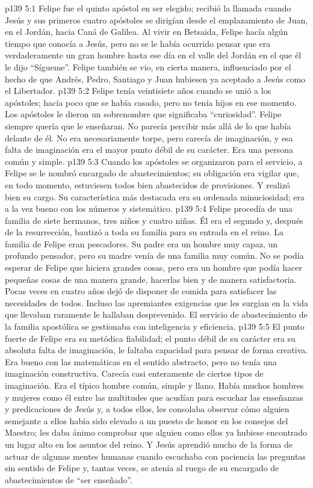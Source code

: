 \vs p139 5:1 Felipe fue el quinto apóstol en ser elegido; recibió la llamada cuando Jesús y sus primeros cuatro apóstoles se dirigían desde el emplazamiento de Juan, en el Jordán, hacia Caná de Galilea. Al vivir en Betsaida, Felipe hacía algún tiempo que conocía a Jesús, pero no se le había ocurrido pensar que era verdaderamente un gran hombre hasta ese día en el valle del Jordán en el que él le dijo “Sígueme”. Felipe también se vio, en cierta manera, influenciado por el hecho de que Andrés, Pedro, Santiago y Juan hubiesen ya aceptado a Jesús como el Libertador.
\vs p139 5:2 Felipe tenía veintisiete años cuando se unió a los apóstoles; hacía poco que se había casado, pero no tenía hijos en ese momento. Los apóstoles le dieron un sobrenombre que significaba “curiosidad”. Felipe siempre quería que le enseñaran. No parecía percibir más allá de lo que había delante de él. No era necesariamente torpe, pero carecía de imaginación, y esa falta de imaginación era el mayor punto débil de su carácter. Era una persona común y simple.
\vs p139 5:3 \pc Cuando los apóstoles se organizaron para el servicio, a Felipe se le nombró encargado de abastecimientos; su obligación era vigilar que, en todo momento, estuviesen todos bien abastecidos de provisiones. Y realizó bien su cargo. Su característica más destacada era su ordenada minuciosidad; era a la vez bueno con los números y sistemático.
\vs p139 5:4 Felipe procedía de una familia de siete hermanos, tres niños y cuatro niñas. Él era el segundo y, después de la resurrección, bautizó a toda su familia para su entrada en el reino. La familia de Felipe eran pescadores. Su padre era un hombre muy capaz, un profundo pensador, pero su madre venía de una familia muy común. No se podía esperar de Felipe que hiciera grandes cosas, pero era un hombre que podía hacer pequeñas cosas de una manera grande, hacerlas bien y de manera satisfactoria. Pocas veces en cuatro años dejó de disponer de comida para satisfacer las necesidades de todos. Incluso las apremiantes exigencias que les surgían en la vida que llevaban raramente le hallaban desprevenido. El servicio de abastecimiento de la familia apostólica se gestionaba con inteligencia y eficiencia.
\vs p139 5:5 El punto fuerte de Felipe era su metódica fiabilidad; el punto débil de su carácter era su absoluta falta de imaginación, le faltaba capacidad para pensar de forma creativa. Era bueno con las matemáticas en el sentido abstracto, pero no tenía una imaginación constructiva. Carecía casi enteramente de ciertos tipos de imaginación. Era el típico hombre común, simple y llano. Había muchos hombres y mujeres como él entre las multitudes que acudían para escuchar las enseñanzas y predicaciones de Jesús y, a todos ellos, les consolaba observar cómo alguien semejante a ellos había sido elevado a un puesto de honor en los consejos del Maestro; les daba ánimo comprobar que alguien como ellos ya hubiese encontrado un lugar alto en los asuntos del reino. Y Jesús aprendió mucho de la forma de actuar de algunas mentes humanas cuando escuchaba con paciencia las preguntas sin sentido de Felipe y, tantas veces, se atenía al ruego de su encargado de abastecimientos de “ser enseñado”.
